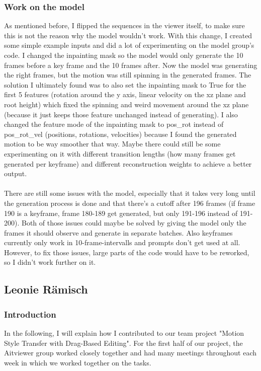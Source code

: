 \documentclass[a4paper]{scrartcl}
\begin{document}
\subsubsection*{Work on the model}
As mentioned before, I flipped the sequences in the viewer itself, to make sure this is not the reason why the model wouldn't work. With this change, I created some simple example inputs and did a lot of experimenting on the model group's code. I changed the inpainting mask so the model would only generate the 10 frames before a key frame and the 10 frames after. Now the model was generating the right frames, but the motion was still spinning in the generated frames. The solution I ultimately found was to also set the inpainting mask to True for the first 5 features (rotation around the y axis, linear velocity on the xz plane and root height) which fixed the spinning and weird movement around the xz plane (because it just keeps those feature unchanged instead of generating). I also changed the feature mode of the inpainting mask to pos\_rot instead of pos\_rot\_vel (positions, rotations, velocities) because I found the generated motion to be way smoother that way. Maybe there could still be some experimenting on it with different transition lengths (how many frames get generated per keyframe) and different reconstruction weights to achieve a better output.\\\\
There are still some issues with the model, especially that it takes very long until the generation process is done and that there's a cutoff after 196 frames (if frame 190 is a keyframe, frame 180-189 get generated, but only 191-196 instead of 191-200). Both of those issues could maybe be solved by giving the model only the frames it should observe and generate in separate batches. Also keyframes currently only work in 10-frame-intervalls and prompts don't get used at all. However, to fix those issues, large parts of the code would have to be reworked, so I didn't work further on it.

\subsection*{Leonie Rämisch}
\subsubsection*{Introduction}
In the following, I will explain how I contributed to our team project "Motion Style Transfer with Drag-Based Editing". For the first half of our project, the Aitviewer group worked closely together and had many meetings throughout each week in which we worked together on the tasks. 
\end{document}
